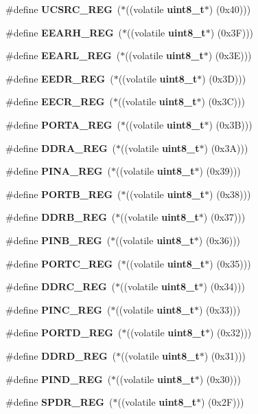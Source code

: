 \begin{DoxyCompactItemize}
\item 
\#define \textbf{ U\+C\+S\+R\+C\+\_\+\+R\+EG}~($\ast$((volatile \textbf{ uint8\+\_\+t}$\ast$) (0x40)))
\item 
\#define \textbf{ E\+E\+A\+R\+H\+\_\+\+R\+EG}~($\ast$((volatile \textbf{ uint8\+\_\+t}$\ast$) (0x3\+F)))
\item 
\#define \textbf{ E\+E\+A\+R\+L\+\_\+\+R\+EG}~($\ast$((volatile \textbf{ uint8\+\_\+t}$\ast$) (0x3\+E)))
\item 
\#define \textbf{ E\+E\+D\+R\+\_\+\+R\+EG}~($\ast$((volatile \textbf{ uint8\+\_\+t}$\ast$) (0x3\+D)))
\item 
\#define \textbf{ E\+E\+C\+R\+\_\+\+R\+EG}~($\ast$((volatile \textbf{ uint8\+\_\+t}$\ast$) (0x3\+C)))
\item 
\#define \textbf{ P\+O\+R\+T\+A\+\_\+\+R\+EG}~($\ast$((volatile \textbf{ uint8\+\_\+t}$\ast$) (0x3\+B)))
\item 
\#define \textbf{ D\+D\+R\+A\+\_\+\+R\+EG}~($\ast$((volatile \textbf{ uint8\+\_\+t}$\ast$) (0x3\+A)))
\item 
\#define \textbf{ P\+I\+N\+A\+\_\+\+R\+EG}~($\ast$((volatile \textbf{ uint8\+\_\+t}$\ast$) (0x39)))
\item 
\#define \textbf{ P\+O\+R\+T\+B\+\_\+\+R\+EG}~($\ast$((volatile \textbf{ uint8\+\_\+t}$\ast$) (0x38)))
\item 
\#define \textbf{ D\+D\+R\+B\+\_\+\+R\+EG}~($\ast$((volatile \textbf{ uint8\+\_\+t}$\ast$) (0x37)))
\item 
\#define \textbf{ P\+I\+N\+B\+\_\+\+R\+EG}~($\ast$((volatile \textbf{ uint8\+\_\+t}$\ast$) (0x36)))
\item 
\#define \textbf{ P\+O\+R\+T\+C\+\_\+\+R\+EG}~($\ast$((volatile \textbf{ uint8\+\_\+t}$\ast$) (0x35)))
\item 
\#define \textbf{ D\+D\+R\+C\+\_\+\+R\+EG}~($\ast$((volatile \textbf{ uint8\+\_\+t}$\ast$) (0x34)))
\item 
\#define \textbf{ P\+I\+N\+C\+\_\+\+R\+EG}~($\ast$((volatile \textbf{ uint8\+\_\+t}$\ast$) (0x33)))
\item 
\#define \textbf{ P\+O\+R\+T\+D\+\_\+\+R\+EG}~($\ast$((volatile \textbf{ uint8\+\_\+t}$\ast$) (0x32)))
\item 
\#define \textbf{ D\+D\+R\+D\+\_\+\+R\+EG}~($\ast$((volatile \textbf{ uint8\+\_\+t}$\ast$) (0x31)))
\item 
\#define \textbf{ P\+I\+N\+D\+\_\+\+R\+EG}~($\ast$((volatile \textbf{ uint8\+\_\+t}$\ast$) (0x30)))
\item 
\#define \textbf{ S\+P\+D\+R\+\_\+\+R\+EG}~($\ast$((volatile \textbf{ uint8\+\_\+t}$\ast$) (0x2\+F)))

\end{DoxyCompactItemize}
